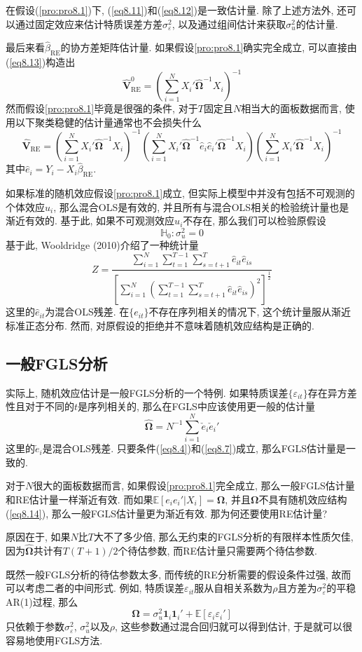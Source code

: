 \documentclass[cn, 12pt, math=mtpro2, bibstyle=apa, blue, twocol]{elegantbook}
\newcommand{\E}{\mathbb{E}}
\newcommand{\hb}{\hat{\beta}}
\newcommand{\HH}{\mathbb{H}}
\newcommand{\V}{\mathbold{V}}
\newcommand{\BO}{\mathbold{\Omega}}
\begin{document}
在假设(\ref{pro:pro8.1})下, (\ref{eq8.11})和(\ref{eq8.12})是一致估计量. 除了上述方法外, 还可以通过固定效应来估计特质误差方差$\sigma_\varepsilon^2$, 以及通过组间估计来获取$\sigma_u^2$的估计量.

最后来看$\hb_{\text{RE}}$的协方差矩阵估计量. 如果假设\ref{pro:pro8.1}确实完全成立, 可以直接由(\ref{eq8.13})构造出
$$\hat{\V}_{\text{RE}}^0=\left(\sum_{i=1}^{N}X_i'\hat{\BO}^{-1}X_i\right)^{-1}$$
然而假设\ref{pro:pro8.1}毕竟是很强的条件, 对于$T$固定且$N$相当大的面板数据而言, 使用以下聚类稳健的估计量通常也不会损失什么
$$\hat{\V}_{\text{RE}}=\left(\sum_{i=1}^{N}X_i'\hat{\BO}^{-1}X_i\right)^{-1}\left(\sum_{i=1}^{N}X_i'\hat{\BO}^{-1}\hat{e}_i\hat{e}_i'\hat{\BO}^{-1}X_i\right)\left(\sum_{i=1}^{N}X_i'\hat{\BO}^{-1}X_i\right)^{-1}$$
其中$\hat{e}_i=Y_i-X_i\hat{\beta}_{\text{RE}}$.

如果标准的随机效应假设\ref{pro:pro8.1}成立, 但实际上模型中并没有包括不可观测的个体效应$u_i$, 那么混合OLS是有效的, 并且所有与混合OLS相关的检验统计量也是渐近有效的. 基于此, 如果不可观测效应$u_i$不存在, 那么我们可以检验原假设
$$\HH_0: \sigma_u^2=0$$
基于此, Wooldridge (2010)介绍了一种统计量
$$Z=\frac{\displaystyle\sum_{i=1}^{N}\sum_{t=1}^{T-1}\sum_{s=t+1}^{T}\hat{e}_{it}\hat{e}_{is}}{\displaystyle\left[\sum_{i=1}^{N}\left(\sum_{t=1}^{T-1}\sum_{s=t+1}^{T}\hat{e}_{it}\hat{e}_{is}\right)^2\right]^{\frac{1}{2}}}$$
这里的$\hat{e}_{it}$为混合OLS残差. 在$\{e_{it}\}$不存在序列相关的情况下, 这个统计量服从渐近标准正态分布. 然而, 对原假设的拒绝并不意味着随机效应结构是正确的.


\subsection{一般FGLS分析}
实际上, 随机效应估计是一般FGLS分析的一个特例. 如果特质误差$\{\varepsilon_{it}\}$存在异方差性且对于不同的$t$是序列相关的, 那么在FGLS中应该使用更一般的估计量
$$\hat{\BO}=N^{-1}\sum_{i=1}^{N}\check{e}_{i}\check{e}_i'$$
这里的$\check{e}_i$是混合OLS残差. 只要条件(\ref{eq8.4})和(\ref{eq8.7})成立, 那么FGLS估计量是一致的.

对于$N$很大的面板数据而言, 如果假设\ref{pro:pro8.1}完全成立, 那么一般FGLS估计量和RE估计量一样渐近有效. 而如果$\E[e_ie_i'|X_i]=\BO$, 并且$\BO$不具有随机效应结构(\ref{eq8.14}), 那么一般FGLS估计量更为渐近有效. 那为何还要使用RE估计量?

原因在于, 如果$N$比$T$大不了多少倍, 那么无约束的FGLS分析的有限样本性质欠佳, 因为$\hat{\BO}$共计有$T(T+1)/2$个待估参数, 而RE估计量只需要两个待估参数.

既然一般FGLS分析的待估参数太多, 而传统的RE分析需要的假设条件过强, 故而可以考虑二者的中间形式. 例如, 特质误差$\varepsilon_{it}$服从自相关系数为$\rho$且方差为$\sigma_\varepsilon^2$的平稳AR(1)过程, 那么
$$\BO=\sigma^2_u\mathbf{1}_i\mathbf{1}_i'+\E[\varepsilon_i\varepsilon_i']$$
只依赖于参数$\sigma_\varepsilon^2$, $\sigma_u^2$以及$\rho$, 这些参数通过混合回归就可以得到估计, 于是就可以很容易地使用FGLS方法.
\newpage
\end{document}

